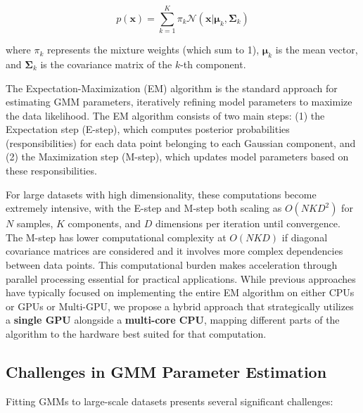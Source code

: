 \documentclass[conference]{IEEEtran}
\begin{document}
\begin{equation}
p(\mathbf{x}) = \sum_{k=1}^{K} \pi_k \mathcal{N}(\mathbf{x}|\boldsymbol{\mu}_k, \boldsymbol{\Sigma}_k)
\end{equation}

\noindent where $\pi_k$ represents the mixture weights (which sum to 1), $\boldsymbol{\mu}_k$ is the mean vector, and $\boldsymbol{\Sigma}_k$ is the covariance matrix of the $k$-th component.

The Expectation-Maximization (EM) algorithm is the standard approach for estimating GMM parameters, iteratively refining model parameters to maximize the data likelihood. The EM algorithm consists of two main steps: (1) the Expectation step (E-step), which computes posterior probabilities (responsibilities) for each data point belonging to each Gaussian component, and (2) the Maximization step (M-step), which updates model parameters based on these responsibilities.

For large datasets with high dimensionality, these computations become extremely intensive, with the E-step and M-step both scaling as $O(NKD^2)$ for $N$ samples, $K$ components, and $D$ dimensions per iteration until convergence. The M-step has lower computational complexity at $O(NKD)$ if diagonal covariance matrices are considered and it involves more complex dependencies between data points. This computational burden makes acceleration through parallel processing essential for practical applications. While previous approaches have typically focused on implementing the entire EM algorithm on either CPUs or GPUs or Multi-GPU, we propose a hybrid approach that strategically utilizes a \textbf{single GPU} alongside a \textbf{multi-core CPU}, mapping different parts of the algorithm to the hardware best suited for that computation.

\subsection{Challenges in GMM Parameter Estimation}

Fitting GMMs to large-scale datasets presents several significant challenges:
\end{document}
